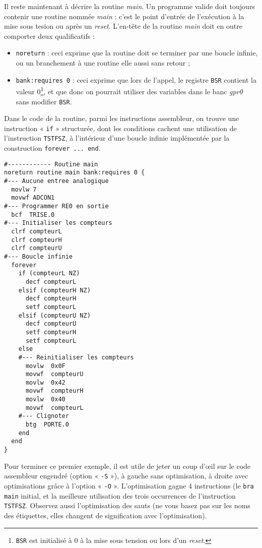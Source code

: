 Il reste maintenant à décrire la routine \emph{main}. Un programme valide doit toujours contenir une routine nommée \emph{main} : c'est le point d'entrée de l'exécution à la mise sous tesion ou après un \emph{reset}. L'en-tête de la routine \emph{main} doit en outre comporter deux qualificatifs :
\begin{itemize}
  \item \texttt{noreturn} : ceci exprime que la routine doit se terminer par une boucle infinie, ou un branchement à une routine elle aussi sans retour ;
  \item \texttt{bank:requires 0} : ceci exprime que lors de l'appel, le registre \texttt{BSR} contient la valeur 0\footnote{\texttt{BSR} est initialisé à 0 à la mise sous tension ou lors d'un \emph{reset}.}, et que donc on pourrait utiliser des variables dans le banc \emph{gpr0} sans modifier \texttt{BSR}.
\end{itemize}

Dans le code de la routine, parmi les instructions assembleur, on trouve une instruction « \texttt{if} » structurée, dont les conditions cachent une utilisation de l’instruction \texttt{TSTFSZ}, à l'intérieur d'une boucle infinie implémentée par la construction \texttt{forever ... end}.

\begin{lstlisting}[language=piccolo]
#------------ Routine main
noreturn routine main bank:requires 0 {
#--- Aucune entree analogique
  movlw 7
  movwf ADCON1
#--- Programmer RE0 en sortie
  bcf  TRISE.0
#--- Initialiser les compteurs
  clrf compteurL
  clrf compteurH
  clrf compteurU
#--- Boucle infinie
  forever
    if (compteurL NZ)
      decf compteurL
    elsif (compteurH NZ)
      decf compteurH
      setf compteurL
    elsif (compteurU NZ)
      decf compteurU
      setf compteurH
      setf compteurL
    else
    #--- Reinitialiser les compteurs
      movlw  0x0F
      movwf  compteurU
      movlw  0x42
      movwf  compteurH
      movlw  0x40
      movwf  compteurL
    #--- Clignoter
      btg  PORTE.0
    end
  end
}
\end{lstlisting}

Pour terminer ce premier exemple, il est utile de jeter un coup d’œil sur le code assembleur engendré (option « \texttt{-S} »), à gauche sans optimisation, à droite avec optimisations grâce à l’option « \texttt{-O} ». L’optimisation gagne 4 instructions (le \texttt{bra main} initial, et la meilleure utilisation des trois occurrences de l’instruction \texttt{TSTFSZ}. Observez aussi l’optimisation des sauts (ne vous basez pas sur les noms des étiquettes, elles changent de signification avec l’optimisation).

